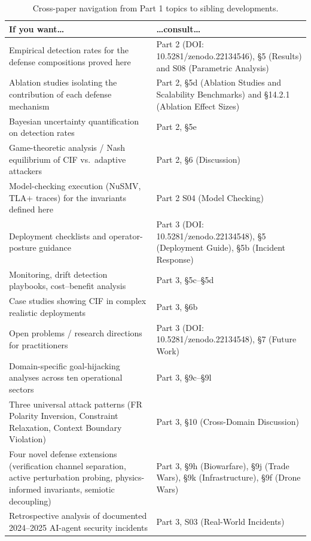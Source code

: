 \documentclass[
]{article}
\begin{document}
\begin{table}[htbp]
\centering
\caption{Cross-paper navigation from Part 1 topics to sibling developments.}
\label{tab:part1-navigation}
\small
\begin{tabular}{@{}p{}p{}@{}}
\toprule
If you want\ldots & \ldots consult\ldots \\
\midrule
Empirical detection rates for the defense compositions proved here & Part 2 (DOI: 10.5281/zenodo.22134546), \S{5} (Results) and S08 (Parametric Analysis) \\
Ablation studies isolating the contribution of each defense mechanism & Part 2, \S{5d} (Ablation Studies and Scalability Benchmarks) and \S{14.2.1} (Ablation Effect Sizes) \\
Bayesian uncertainty quantification on detection rates & Part 2, \S{5e} \\
Game-theoretic analysis / Nash equilibrium of CIF vs.\ adaptive attackers & Part 2, \S{6} (Discussion) \\
Model-checking execution (NuSMV, TLA+ traces) for the invariants defined here & Part 2 S04 (Model Checking) \\
Deployment checklists and operator-posture guidance & Part 3 (DOI: 10.5281/zenodo.22134548), \S{5} (Deployment Guide), \S{5b} (Incident Response) \\
Monitoring, drift detection playbooks, cost--benefit analysis & Part 3, \S{5c}--\S{5d} \\
Case studies showing CIF in complex realistic deployments & Part 3, \S{6b} \\
Open problems / research directions for practitioners & Part 3 (DOI: 10.5281/zenodo.22134548), \S{7} (Future Work) \\
Domain-specific goal-hijacking analyses across ten operational sectors & Part 3, \S{9c}--\S{9l} \\
Three universal attack patterns (FR Polarity Inversion, Constraint Relaxation, Context Boundary Violation) & Part 3, \S{10} (Cross-Domain Discussion) \\
Four novel defense extensions (verification channel separation, active perturbation probing, physics-informed invariants, semiotic decoupling) & Part 3, \S{9h} (Biowarfare), \S{9j} (Trade Wars), \S{9k} (Infrastructure), \S{9f} (Drone Wars) \\
Retrospective analysis of documented 2024--2025 AI-agent security incidents & Part 3, S03 (Real-World Incidents) \\
\bottomrule
\end{tabular}
\end{table}
\end{document}
